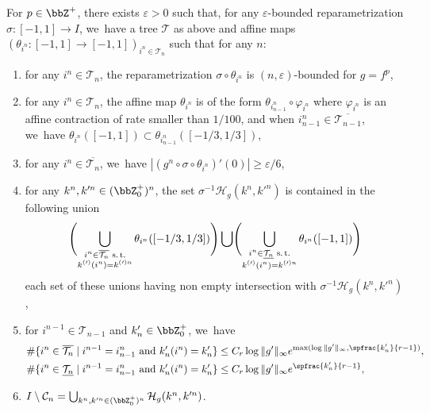 \begin{lem}
\label{lem:RL}
For $p \in \bbZ^+$, there exists $\varepsilon > 0$ such that, for any $\varepsilon$-bounded reparametrization $\sigma : [-1, 1] \to I$, we~have a tree $\mathcal{T}$ as above and affine maps $(\theta_{i^n} : [-1, 1] \to [-1, 1])_{i^n \in \mathcal{T}_n}$ such that for any $n$:

\begin{enumerate}
\item\label{lem:RL1}
for any $i^n \in \mathcal{T}_n$, the reparametrization $\sigma \circ \theta_{i^n}$ is $(n, \varepsilon)$-bounded for $g=f^p$,

\item\label{lem:RL2}
for any $i^n \in \mathcal{T}_n$, the affine map $\theta_{i^n}$ is of the form $\theta_{i^n_{n-1}} \circ \varphi_{i^n}$ where $\varphi_{i^n}$ is an affine contraction of rate smaller than $1/100$, and when $i_{n-1}^n \in \overline{\mathcal{T}_{n-1}}$, we~have $\theta_{i^n}([-1, 1]) \subset \theta_{i_{n-1}^n}([- 1/3, 1/3])$,

\item\label{lem:RL3}
for any $i^n \in \overline{\mathcal{T}_n}$, we~have $| (g^n \circ \sigma \circ \theta_{i^n})' (0) | \geq \varepsilon / 6$,

\item\label{lem:RL4}
for any $k^n, k'^n \in (\bbZ_0^+)^n$, the set $\sigma^{-1} \mathcal{H}_g(k^n, k'^n)$ is contained in the following union
\[\Biggl(\bigcup_{
\substack{
i^n \in \overline{\mathcal{T}_n} \text{ s.\,t.}\\
k^{(\prime)}(i^n) = {k^{(\prime) n}}}}
\theta_{i^n}([-1/3, 1/3]) \Biggr)
\bigcup
\Biggl (\bigcup_{\substack{
i^n \in \underline{\mathcal{T}_n} \text{ s.\,t.}\\
k^{(\prime)}(i^n) = {k^{(\prime) n}}}}
\theta_{i^n}([-1, 1]) \Biggr)
\]
each set of these unions having non empty intersection with $\sigma^{-1} \mathcal{H}_g(k^n, k'^n)$,

\item\label{lem:RL5}
for $i^{n-1} \in \mathcal{T}_{n-1}$ and $k_n' \in \bbZ_0^+$, we~have
\begin{align*}
&\# \{ i^n \in \overline{\mathcal{T}_n} \mid i^{n-1} = i^n_{n-1}\text{ and } k_n'(i^n) = k_n' \} \leq C_r \log \| g' \|_{\infty} e^{\max (\log \| g' \|_{\infty}, \spfrac{k_n'}{r-1})},\\
&\# \{ i^n \in \underline{\mathcal{T}_n} \mid i^{n-1} = i^n_{n-1}\text{ and } k_n'(i^n) = k_n' \} \leq C_r \log \| g' \|_{\infty} e^{\spfrac{k_n'}{r-1}},
\end{align*}

\item\label{lem:RL6}
$I \setminus \mathcal{C}_n = \bigcup_{k^n, k'^n \in (\bbZ_0^+)^n} \mathcal{H}_g(k^n, k'^n)$.
\end{enumerate}
\end{lem}

